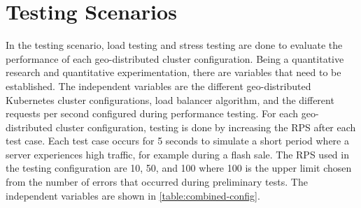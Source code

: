 
\section{Testing Scenarios}
\label{sec:testingScenarios}
In the testing scenario, load testing and stress testing are done to evaluate the performance of each geo-distributed cluster configuration. Being a quantitative research and quantitative experimentation, there are variables that need to be established. The independent variables are the different geo-distributed Kubernetes cluster configurations, load balancer algorithm, and the different requests per second configured during performance testing. For each geo-distributed cluster configuration, testing is done by increasing the RPS after each test case. Each test case occurs for 5 seconds to simulate a short period where a server experiences high traffic, for example during a flash sale. The RPS used in the testing configuration are 10, 50, and 100 where 100 is the upper limit chosen from the number of errors that occurred during preliminary tests. The independent variables are shown in \autoref{table:combined-config}.



